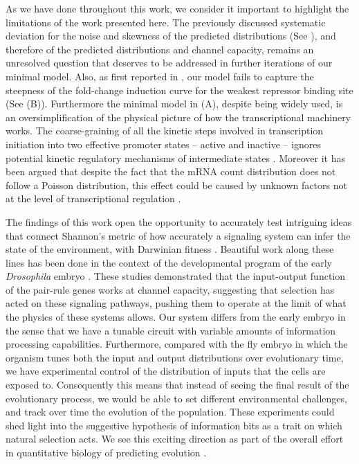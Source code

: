 As we have done throughout this work, we consider it important to highlight the
limitations of the work presented here. The previously discussed systematic
deviation for the noise and skewness of the predicted distributions (See
), and therefore of the predicted distributions and
channel capacity, remains an unresolved question that deserves to be addressed
in further iterations of our minimal model. Also, as first reported in
\cite{Razo-Mejia2018}, our model fails to capture the steepness of the
fold-change induction curve for the weakest repressor binding site (See
(B)). Furthermore the minimal model in
(A), despite being widely used, is an
oversimplification of the physical picture of how the transcriptional machinery
works. The coarse-graining of all the kinetic steps involved in transcription
initiation into two effective promoter states -- active and inactive -- ignores
potential kinetic regulatory mechanisms of intermediate states
\cite{Scholes2017}. Moreover it has been argued that despite the fact that the
mRNA count distribution does not follow a Poisson distribution, this effect
could be caused by unknown factors not at the level of transcriptional
regulation \cite{Choubey2018}.

The findings of this work open the opportunity to accurately test intriguing
ideas that connect Shannon's metric of how accurately a signaling system can
infer the state of the environment, with Darwinian fitness \cite{Taylor2007}.
Beautiful work along these lines has been done in the context of the
developmental program of the early {\it Drosophila} embryo \cite{Tkacik2008,
Petkova2019}. These studies demonstrated that the input-output function of the
pair-rule genes works at channel capacity, suggesting that selection has acted
on these signaling pathways, pushing them to operate at the limit of what the
physics of these systems allows. Our system differs from the early embryo in
the sense that we have a tunable circuit with variable amounts of information
processing capabilities. Furthermore, compared with the fly embryo in which the
organism tunes both the input and output distributions over evolutionary time,
we have experimental control of the distribution of inputs that the cells are
exposed to. Consequently this means that instead of seeing the final result of
the evolutionary process, we would be able to set different environmental
challenges, and track over time the evolution of the population. These
experiments could shed light into the suggestive hypothesis of information bits
as a trait on which natural selection acts. We see this exciting direction as
part of the overall effort in quantitative biology of predicting evolution
\cite{Lassig2017}.